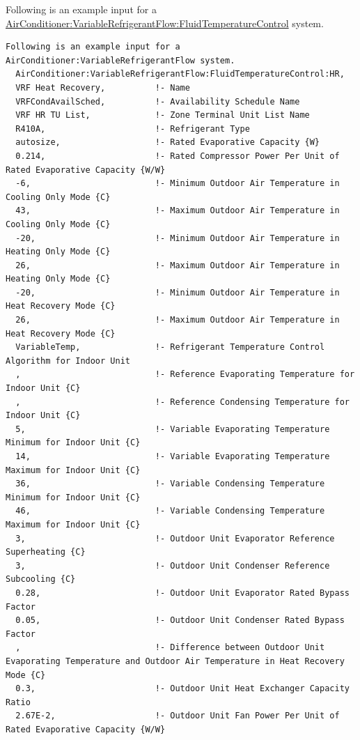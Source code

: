 Following is an example input for a \hyperref[airconditionervariablerefrigerantflowfluidtemperaturecontrol]{AirConditioner:VariableRefrigerantFlow:FluidTemperatureControl} system.

\begin{lstlisting}
Following is an example input for a AirConditioner:VariableRefrigerantFlow system.
  AirConditioner:VariableRefrigerantFlow:FluidTemperatureControl:HR,
  VRF Heat Recovery,          !- Name
  VRFCondAvailSched,          !- Availability Schedule Name
  VRF HR TU List,             !- Zone Terminal Unit List Name
  R410A,                      !- Refrigerant Type
  autosize,                   !- Rated Evaporative Capacity {W}
  0.214,                      !- Rated Compressor Power Per Unit of Rated Evaporative Capacity {W/W}
  -6,                         !- Minimum Outdoor Air Temperature in Cooling Only Mode {C}
  43,                         !- Maximum Outdoor Air Temperature in Cooling Only Mode {C}
  -20,                        !- Minimum Outdoor Air Temperature in Heating Only Mode {C}
  26,                         !- Maximum Outdoor Air Temperature in Heating Only Mode {C}
  -20,                        !- Minimum Outdoor Air Temperature in Heat Recovery Mode {C}
  26,                         !- Maximum Outdoor Air Temperature in Heat Recovery Mode {C}
  VariableTemp,               !- Refrigerant Temperature Control Algorithm for Indoor Unit
  ,                           !- Reference Evaporating Temperature for Indoor Unit {C}
  ,                           !- Reference Condensing Temperature for Indoor Unit {C}
  5,                          !- Variable Evaporating Temperature Minimum for Indoor Unit {C}
  14,                         !- Variable Evaporating Temperature Maximum for Indoor Unit {C}
  36,                         !- Variable Condensing Temperature Minimum for Indoor Unit {C}
  46,                         !- Variable Condensing Temperature Maximum for Indoor Unit {C}
  3,                          !- Outdoor Unit Evaporator Reference Superheating {C}
  3,                          !- Outdoor Unit Condenser Reference Subcooling {C}
  0.28,                       !- Outdoor Unit Evaporator Rated Bypass Factor
  0.05,                       !- Outdoor Unit Condenser Rated Bypass Factor
  ,                           !- Difference between Outdoor Unit Evaporating Temperature and Outdoor Air Temperature in Heat Recovery Mode {C}
  0.3,                        !- Outdoor Unit Heat Exchanger Capacity Ratio
  2.67E-2,                    !- Outdoor Unit Fan Power Per Unit of Rated Evaporative Capacity {W/W}

\end{lstlisting}
